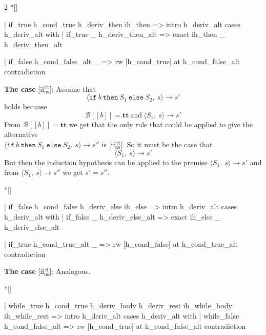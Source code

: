 \begin{paracol}{2}
\switchcolumn[1]*[]
\begin{leftcolumn}
    \begin{Lean_Code}
  | if_true
      h_cond_true h_deriv_then
      ih_then =>
    intro h_deriv_alt
    cases h_deriv_alt with
    | if_true
        _ h_deriv_then_alt =>
      exact ih_then _
             h_deriv_then_alt

    | if_false
        h_cond_false_alt _ =>
      rw [h_cond_true] at
          h_cond_false_alt
      contradiction
    \end{Lean_Code}
\end{leftcolumn}
\begin{rightcolumn}
\textbf{The case} [if$_{\text{ns}}^{\ \text{tt}}$]: Assume that
\[
\langle \mathtt{if}\ b\ \mathtt{then}\ S_1\ \mathtt{else}\ S_2,\ s \rangle \to s'
\]
holds because
\[
\mathcal{B}[\![b]\!] = \mathbf{tt}\ \mbox{and}\ \langle S_1,\ s \rangle \to s'
\]
From \(\mathcal{B}[\![b]\!] = \mathbf{tt}\) we get that the only rule that could be applied to give the
alternative \\
\(\langle \mathtt{if}\ b\ \mathtt{then}\ S_1\ \mathtt{else}\ S_2,\ s \rangle \to s''\) is 
[if$_{\text{ns}}^{\ \text{tt}}$]. So it must be the case that
\[
\langle S_1,\ s \rangle \to s'
\]
But then the induction hypothesis can be applied to the premise \(\langle S_1,\ s \rangle \to s'\)
and from \(\langle S_1,\ s \rangle \to s''\) we get \(s' = s''\).
\end{rightcolumn}
\vspace{2em}


\switchcolumn[1]*[]
\begin{leftcolumn}
    \begin{Lean_Code}
  | if_false
      h_cond_false h_deriv_else
      ih_else =>
    intro h_deriv_alt
    cases h_deriv_alt with
    | if_false
        _ h_deriv_else_alt =>
      exact ih_else _
             h_deriv_else_alt

    | if_true
        h_cond_true_alt _ =>
      rw [h_cond_false] at
          h_cond_true_alt
      contradiction
    \end{Lean_Code}
\end{leftcolumn}
\begin{rightcolumn}
\textbf{The case} [if$_{\text{ns}}^{\ \text{ff}}$]: Analogous.
\end{rightcolumn}
\vspace{2em}


\switchcolumn[1]*[]
\begin{leftcolumn}
    \begin{Lean_Code}
  | while_true
      h_cond_true h_deriv_body
      h_deriv_rest
      ih_while_body
      ih_while_rest =>
    intro h_deriv_alt
    cases h_deriv_alt with
    | while_false
        h_cond_false_alt =>
      rw [h_cond_true] at
          h_cond_false_alt
      contradiction


\end{Lean_Code}
\end{leftcolumn}
\end{paracol}
